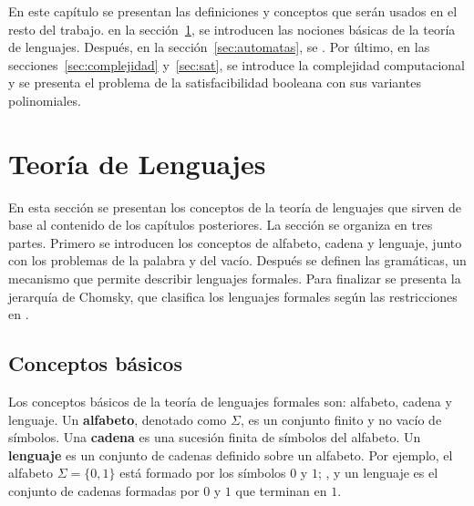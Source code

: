 \documentclass{article}
\theoremstyle{definition}
\theoremstyle{plain}
\theoremstyle{remark}
\begin{document}
\label{cap:preliminares}

En este capítulo se presentan las definiciones y conceptos que serán
usados en el resto del trabajo.  en la
sección~\ref{sec:teoria-lenguajes}, se introducen las nociones
básicas de la teoría de lenguajes. Después, en la
sección~\ref{sec:automatas}, se . Por último,
en las secciones~\ref{sec:complejidad} y~\ref{sec:sat}, se introduce
la complejidad computacional y se presenta el problema de la
satisfacibilidad booleana con sus variantes polinomiales.

\section{Teoría de Lenguajes}
\label{sec:teoria-lenguajes}

En esta sección se presentan los conceptos de la teoría de lenguajes
que sirven de base al contenido de los capítulos posteriores. La sección
se organiza en tres partes. Primero se introducen los conceptos de
alfabeto, cadena y lenguaje, junto con los problemas de la palabra y
del vacío. Después se definen las gramáticas, un mecanismo que permite
describir lenguajes formales. Para finalizar se presenta la jerarquía
de Chomsky, que clasifica los lenguajes formales según las
restricciones en .

\subsection{Conceptos básicos}

Los conceptos básicos de la teoría de lenguajes formales son: alfabeto,
cadena y lenguaje. Un \textbf{alfabeto}, denotado como $\Sigma$, es un
conjunto finito y no vacío de símbolos. Una \textbf{cadena} es una
sucesión finita de símbolos del alfabeto. Un \textbf{lenguaje} es un
conjunto de cadenas definido sobre un alfabeto. Por ejemplo, el alfabeto
$\Sigma = \{0, 1\}$ está formado por los símbolos $0$ y $1$; , y un  lenguaje  es el
conjunto de cadenas formadas por $0$ y $1$ que terminan en $1$.
\end{document}
